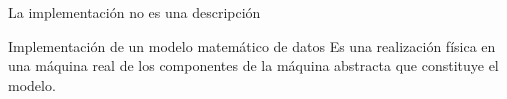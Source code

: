 \begin{frame}{La implementaci\'on no es una descripci\'on}
    \begin{block}{Implementaci\'on de un modelo matem\'atico de datos}
        Es una realizaci\'on f\'isica
        en una m\'aquina real de los componentes
        de la m\'aquina abstracta que constituye el modelo.\\[5mm]
    \end{block}
\end{frame}

